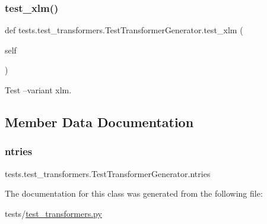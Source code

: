 \subsubsection{\texorpdfstring{test\+\_\+xlm()}{test\_xlm()}}
{\footnotesize\ttfamily def tests.\+test\+\_\+transformers.\+Test\+Transformer\+Generator.\+test\+\_\+xlm (\begin{DoxyParamCaption}\item[{}]{self }\end{DoxyParamCaption})}

\begin{DoxyVerb}Test --variant xlm.
\end{DoxyVerb}
 

\subsection{Member Data Documentation}
\mbox{\label{classtests_1_1test__transformers_1_1TestTransformerGenerator_a1555f81fb11a5497f644e99607c3d17d}} 
\subsubsection{\texorpdfstring{ntries}{ntries}}
{\footnotesize\ttfamily tests.\+test\+\_\+transformers.\+Test\+Transformer\+Generator.\+ntries\hspace{0.3cm}{\ttfamily [static]}}



The documentation for this class was generated from the following file\+:\begin{DoxyCompactItemize}
\item 
tests/\hyperlink{test__transformers_8py}{test\+\_\+transformers.\+py}\end{DoxyCompactItemize}
